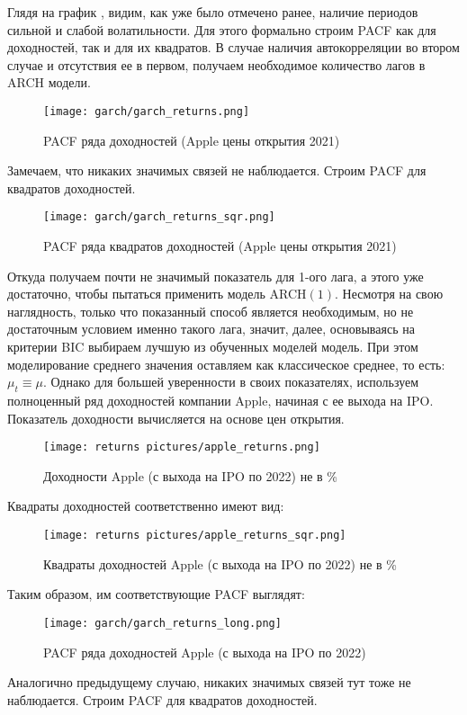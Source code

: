 \noindent Глядя на график , видим, как уже было отмечено ранее, наличие периодов сильной и слабой волатильности. Для этого формально строим PACF как для доходностей, так и для их квадратов. В случае наличия автокорреляции во втором случае и отсутствия ее в первом, получаем необходимое количество лагов в ARCH модели.
\begin{figure}[H]
	\centering
	\texttt{[image: garch/garch\_returns.png]}
	\caption{PACF ряда доходностей (Apple цены открытия 2021)}
\end{figure}
\noindent Замечаем, что никаких значимых связей не наблюдается. Строим PACF для квадратов доходностей.
\begin{figure}[H]
	\centering
	\texttt{[image: garch/garch\_returns\_sqr.png]}
	\caption{PACF ряда квадратов доходностей (Apple цены открытия 2021)}
\end{figure}
\noindent Откуда получаем почти не значимый показатель для 1-ого лага, а этого уже достаточно, чтобы пытаться применить модель ARCH$(1)$. Несмотря на свою наглядность, только что показанный способ является необходимым, но не достаточным условием именно такого лага, значит, далее, основываясь на критерии BIC выбираем лучшую из обученных моделей модель. При этом моделирование среднего значения оставляем как классическое среднее, то есть: $\mu_t \equiv \mu$. Однако для большей уверенности в своих показателях, используем полноценный ряд доходностей компании Apple, начиная с ее выхода на IPO. Показатель доходности вычисляется на основе цен открытия.
\begin{figure}[H]
	\centering
	\texttt{[image: returns pictures/apple\_returns.png]}
	\caption{Доходности Apple (с выхода на IPO по 2022) не в \%}
\end{figure}
\noindent Квадраты доходностей соответственно имеют вид:
\begin{figure}[H]
	\centering
	\texttt{[image: returns pictures/apple\_returns\_sqr.png]}
	\caption{Квадраты доходностей Apple (с выхода на IPO по 2022) не в \%}
\end{figure}
\noindent Таким образом, им соответствующие PACF выглядят:
\begin{figure}[H]
	\centering
	\texttt{[image: garch/garch\_returns\_long.png]}
	\caption{PACF ряда доходностей Apple (с выхода на IPO по 2022)}
\end{figure}
\noindent Аналогично предыдущему случаю, никаких значимых связей тут тоже не наблюдается. Строим PACF для квадратов доходностей.
